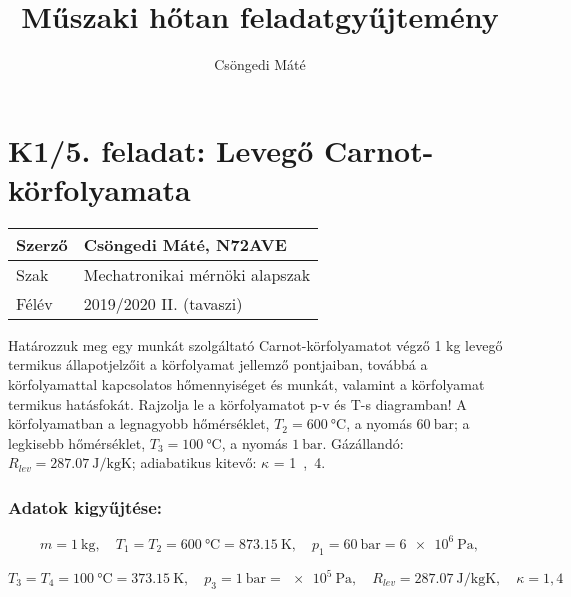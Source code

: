 
\author{Csöngedi Máté}
\title{Műszaki hőtan feladatgyűjtemény}
\date{}
\usetikzlibrary{arrows,decorations.markings}

\section*{K1/5. feladat: Levegő Carnot-körfolyamata}

\begin{tabular}{ | p{2cm} | p{14cm} | } 
	\hline
	Szerző & Csöngedi Máté, N72AVE \\ 
	\hline
	Szak & Mechatronikai mérnöki alapszak \\ 
	\hline
	Félév & 2019/2020 II. (tavaszi) \\ 
	\hline
\end{tabular}
\vspace{0.5cm}

\noindent Határozzuk meg egy munkát szolgáltató Carnot-körfolyamatot végző 1 kg levegő termikus állapotjelzőit a körfolyamat jellemző pontjaiban, továbbá a körfolyamattal kapcsolatos hőmennyiséget és munkát, valamint a körfolyamat termikus hatásfokát. Rajzolja le a körfolyamatot p-v és T-s diagramban! A körfolyamatban a legnagyobb hőmérséklet, $T_2 = \SI{600}{\celsius}$, a nyomás $\SI{60}{\bar}$; a legkisebb hőmérséklet, $T_3 = \SI{100}{\celsius}$, a nyomás $\SI{1}{\bar}$. Gázállandó: $R_{lev} = \SI{287,07}{\joule\per\kilogram\kelvin}$; adiabatikus kitevő: $\kappa$ = \si{1,4}.


\subsubsection{Adatok kigyűjtése:}

\begin{equation*}
	m = \SI{1}{\kilogram}, 
	\quad 
	T_1 = T_2 = \SI{600}{\celsius} = \SI{873,15}{\kelvin}, 
	\quad
	p_1 = \SI{60}{\bar} = \SI{6e6}{\pascal},
\end{equation*}
	
\begin{equation*}
	T_3 = T_4 = \SI{100}{\celsius} = \SI{373,15}{\kelvin},
	\quad
	p_3 = \SI{1}{\bar} = \SI{e5}{\pascal},
	\quad
	R_{lev} = \SI{287,07}{\joule\per\kilogram\kelvin},
	\quad
	\kappa = \si{1,4}
\end{equation*}

